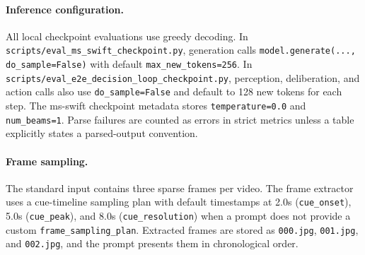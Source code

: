 \paragraph{Inference configuration.}
All local checkpoint evaluations use greedy decoding. In \texttt{scripts/eval\_ms\_swift\_checkpoint.py}, generation calls \texttt{model.generate(..., do\_sample=False)} with default \texttt{max\_new\_tokens=256}. In \texttt{scripts/eval\_e2e\_decision\_loop\_checkpoint.py}, perception, deliberation, and action calls also use \texttt{do\_sample=False} and default to 128 new tokens for each step. The ms-swift checkpoint metadata stores \texttt{temperature=0.0} and \texttt{num\_beams=1}. Parse failures are counted as errors in strict metrics unless a table explicitly states a parsed-output convention.

\paragraph{Frame sampling.}
The standard input contains three sparse frames per video. The frame extractor uses a cue-timeline sampling plan with default timestamps at 2.0s (\texttt{cue\_onset}), 5.0s (\texttt{cue\_peak}), and 8.0s (\texttt{cue\_resolution}) when a prompt does not provide a custom \texttt{frame\_sampling\_plan}. Extracted frames are stored as \texttt{000.jpg}, \texttt{001.jpg}, and \texttt{002.jpg}, and the prompt presents them in chronological order.

